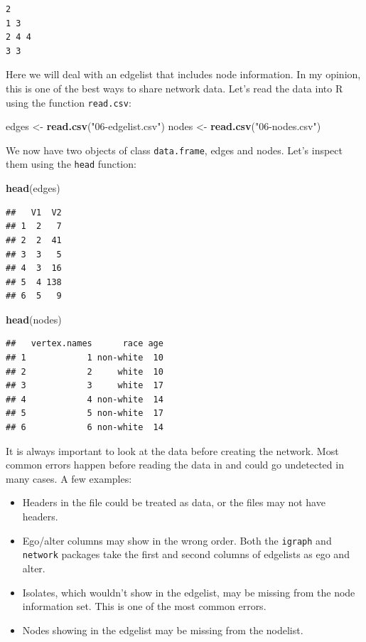 \documentclass[]{book}
\newenvironment{Shaded}{\begin{snugshade}}{\end{snugshade}}
\newcommand{\KeywordTok}[1]{\textcolor[rgb]{0.13,0.29,0.53}{\textbf{#1}}}
\newcommand{\NormalTok}[1]{#1}
\newcommand{\StringTok}[1]{\textcolor[rgb]{0.31,0.60,0.02}{#1}}
\begin{document}
\begin{verbatim}
2 
1 3 
2 4 4 
3 3 
\end{verbatim}

Here we will deal with an edgelist that includes node information.
In my opinion, this is one of the best ways to share network data. Let's read
the data into R using the function \texttt{read.csv}:

\begin{Shaded}
\begin{Highlighting}[]
\NormalTok{edges <-}\StringTok{ }\KeywordTok{read.csv}\NormalTok{(}\StringTok{"06-edgelist.csv"}\NormalTok{)}
\NormalTok{nodes <-}\StringTok{ }\KeywordTok{read.csv}\NormalTok{(}\StringTok{"06-nodes.csv"}\NormalTok{)}
\end{Highlighting}
\end{Shaded}

We now have two objects of class \texttt{data.frame}, edges and nodes. Let's inspect
them using the \texttt{head} function:

\begin{Shaded}
\begin{Highlighting}[]
\KeywordTok{head}\NormalTok{(edges)}
\end{Highlighting}
\end{Shaded}

\begin{verbatim}
##   V1  V2
## 1  2   7
## 2  2  41
## 3  3   5
## 4  3  16
## 5  4 138
## 6  5   9
\end{verbatim}

\begin{Shaded}
\begin{Highlighting}[]
\KeywordTok{head}\NormalTok{(nodes)}
\end{Highlighting}
\end{Shaded}

\begin{verbatim}
##   vertex.names      race age
## 1            1 non-white  10
## 2            2     white  10
## 3            3     white  17
## 4            4 non-white  14
## 5            5 non-white  17
## 6            6 non-white  14
\end{verbatim}

It is always important to look at the data before creating the network. Most common
errors happen before reading the data in and could go undetected in many cases.
A few examples:

\begin{itemize}
\item
  Headers in the file could be treated as data, or the files may not
  have headers.
\item
  Ego/alter columns may show in the wrong order. Both the \texttt{igraph} and \texttt{network}
  packages take the first and second columns of edgelists as ego and alter.
\item
  Isolates, which wouldn't show in the edgelist, may be missing from the node
  information set. This is one of the most common errors.
\item
  Nodes showing in the edgelist may be missing from the nodelist.
\end{itemize}
\end{document}

